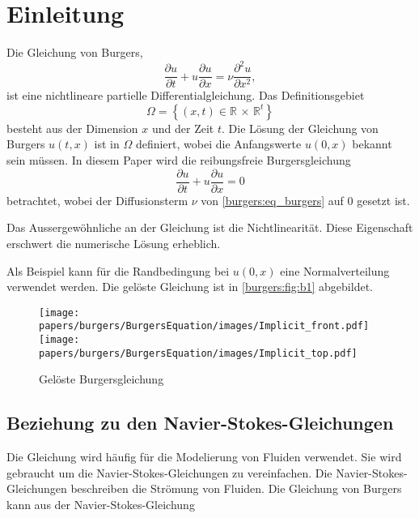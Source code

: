 %
%
\section{Einleitung \label{burgers:section:einleitung}}

	Die Gleichung von Burgers,
%
%
	\begin{equation}
		  \frac {\partial u}{\partial t}+u{\frac {\partial u}{\partial x}}=\nu {\frac {\partial ^{2}u}{\partial x^{2}}},
		  \label{burgers:eq_burgers}
	\end{equation}
	ist eine nichtlineare partielle Differentialgleichung.
%
%
	Das Definitionsgebiet
	\begin{equation}
		\Omega = \left \{ (x,t) \in  \mathbb{R} \, \times \,  \mathbb{R}^t \right \}
	\end{equation}
	besteht aus der Dimension $x$ und der Zeit $t$.
	Die Lösung der Gleichung von Burgers $u(t,x)$ ist in $\Omega$ definiert, wobei die Anfangswerte $u(0,x)$ bekannt sein müssen.
	In diesem Paper wird die reibungsfreie Burgersgleichung
%
	\begin{equation}
		\frac {\partial u}{\partial t}+u{\frac {\partial u}{\partial x}}=0
		\label{burgers:eq_invisid_burgers}
	\end{equation}
	betrachtet, wobei der Diffusionsterm $\nu$ von \eqref{burgers:eq_burgers} auf 0 gesetzt ist.

	Das Aussergewöhnliche an der Gleichung ist die Nichtlinearität. Diese Eigenschaft erschwert die numerische L\"osung erheblich.
%

	Als Beispiel kann f\"ur die Randbedingung bei $u(0,x)$ eine Normalverteilung verwendet werden.
	Die gel\"oste Gleichung ist in \autoref{burgers:fig:b1} abgebildet.

	    \begin{figure}
		\centering
		\texttt{[image: papers/burgers/BurgersEquation/images/Implicit\_front.pdf]}
		\texttt{[image: papers/burgers/BurgersEquation/images/Implicit\_top.pdf]}
		\caption{Gel\"oste Burgersgleichung}
		\label{burgers:fig:b1}
		\end{figure}


	\subsection{Beziehung zu den Navier-Stokes-Gleichungen}
%
		Die Gleichung wird häufig für die Modelierung von Fluiden verwendet.
		Sie wird gebraucht um die Navier-Stokes-Gleichungen zu vereinfachen.
		Die Navier-Stokes-Gleichungen beschreiben die Str\"omung von Fluiden.
		Die Gleichung von Burgers kann aus der Navier-Stokes-Gleichung

